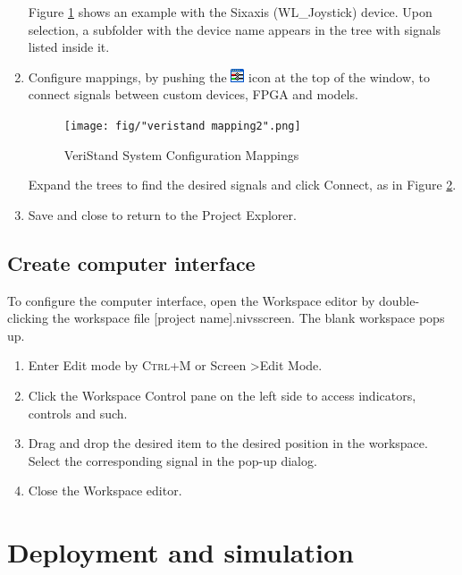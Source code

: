 \documentclass[a4paper,twoside,english]{report}
\newcommand{\noun}[1]{\textsc{#1}}
\begin{document}
\begin{enumerate}
\begin{figure}[!h]
\label{fig: veristand system explorer custom device selection-1} 
\end{figure}
 Figure \ref{fig: veristand system explorer custom device selection-1}
shows an example with the Sixaxis (WL\_Joystick) device. Upon selection,
a subfolder with the device name appears in the tree with signals
listed inside it.
\item Configure mappings, by pushing the \includegraphics[scale=0.8]{fig/veristand_sysex_mappingbtn}
icon at the top of the window, to connect signals between custom devices,
FPGA and models.
\begin{figure}[!h]
\centering \texttt{[image: fig/"veristand mapping2".png]}
\caption{VeriStand System Configuration Mappings}

\label{fig: veristand mappings-1} 
\end{figure}
 Expand the trees to find the desired signals and click Connect, as
in Figure \ref{fig: veristand mappings-1}.
\item Save and close to return to the Project Explorer.
\end{enumerate}

\subsection{\label{subsec: Create computer interface}Create computer interface}

To configure the computer interface, open the Workspace editor by
double-clicking the workspace file {[}project name{]}.nivsscreen.
The blank workspace pops up.
\begin{enumerate}
\item Enter Edit mode by \noun{Ctrl+M} or Screen \textgreater  Edit Mode.
\item Click the Workspace Control pane on the left side to access indicators,
controls and such.
\item Drag and drop the desired item to the desired position in the workspace.
Select the corresponding signal in the pop-up dialog.
\item Close the Workspace editor.
\end{enumerate}
\clearpage{}

\section{Deployment and simulation}
\end{document}
